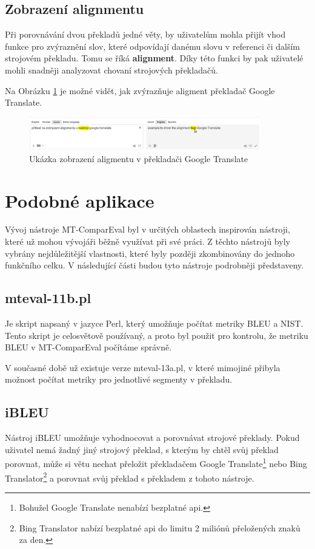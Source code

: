 \subsection{Zobrazení alignmentu}
Při porovnávání dvou překladů jedné věty,
  by uživatelům mohla přijít vhod funkce pro zvýraznění slov,
  které odpovídají danému slovu v referenci či dalším strojovém překladu.
Tomu se říká \textbf{alignment}.
Díky této funkci by pak uživatelé mohli snadněji analyzovat chovaní strojových překladačů.

Na Obrázku \ref{img:alignment} je možné vidět, jak zvýrazňuje aligment překladač Google Translate.
\begin{figure}
	\center
	\includegraphics[width=0.9\textwidth]{img/alignment.eps}
	\caption{Ukázka zobrazení aligmentu v překladači Google Translate}
	\label{img:alignment}
\end{figure}

\section{Podobné aplikace}
Vývoj nástroje MT-ComparEval byl v určitých oblastech inspirován nástroji,
  které už mohou vývojáři běžně využívat při své práci.
Z těchto nástrojů byly vybrány nejdůležitější vlastnosti,
  které byly později zkombinovány do jednoho funkčního celku.
V následující části budou tyto nástroje podrobněji představeny.

\subsection{mteval-11b.pl}
Je skript napsaný v jazyce Perl,
  který umožňuje počítat metriky BLEU a NIST.
Tento skript je celosvětově používaný,
  a proto byl použit pro kontrolu,
  že metriku BLEU v MT-ComparEval počítáme správně.

V současné době už existuje verze mteval-13a.pl,
  v které mimojiné přibyla možnost počítat metriky pro jednotlivé segmenty v překladu.

\subsection{iBLEU}
Nástroj iBLEU umožňuje vyhodnocovat a porovnávat strojové překlady.
Pokud uživatel nemá žadný jiný strojový překlad,
  s kterým by chtěl svůj překlad porovnat,
  může si větu nechat přeložit překladačem Google Translate\footnote{
    Bohužel Google Translate nenabízí bezplatné api.
  } nebo Bing Translator\footnote{
    Bing Translator nabízí bezplatné api do limitu 2 miliónů přeložených znaků za den.
  }
  a porovnat svůj překlad s překladem z tohoto nástroje.

